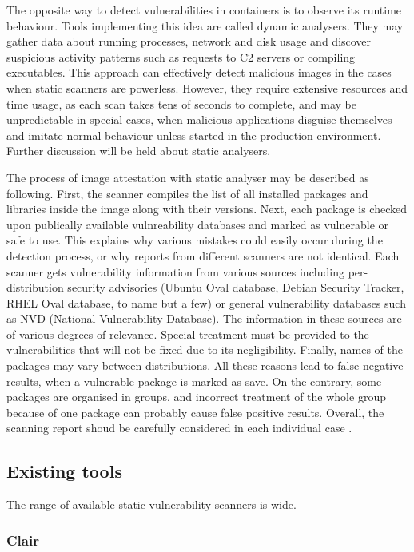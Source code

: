The opposite way to detect vulnerabilities in containers is to observe its runtime behaviour. Tools implementing this idea are called dynamic analysers. They may gather data about running processes, network and disk usage and discover suspicious activity patterns such as requests to C2 servers or compiling executables. This approach can effectively detect malicious images in the cases when static scanners are powerless. However, they require extensive resources and time usage, as each scan takes tens of seconds to complete, and may be unpredictable in special cases, when malicious applications disguise themselves and imitate normal behaviour unless started in the production environment. Further discussion will be held about static analysers.

The process of image attestation with static analyser may be described as following. First, the scanner compiles the list of all installed packages and libraries inside the image along with their versions. Next, each package is checked upon publically available vulnreability databases and marked as vulnerable or safe to use. This explains why various mistakes could easily occur during the detection process, or why reports from different scanners are not identical. Each scanner gets vulnerability information from various sources including per-distribution security advisories (Ubuntu Oval database, Debian Security Tracker, RHEL Oval database, to name but a few) or general vulnerability databases such as NVD (National Vulnerability Database). The information in these sources are of various degrees of relevance. Special treatment must be provided to the vulnerabilities that will not be fixed due to its negligibility. Finally, names of the packages may vary between distributions. All these reasons lead to false negative results, when a vulnerable package is marked as save. On the contrary, some packages are organised in groups, and incorrect treatment of the whole group because of one package can probably cause false positive results. Overall, the scanning report shoud be carefully considered in each individual case \cite{book:rice}.

\subsection{Existing tools}

The range of available static vulnerability scanners is wide. 

\subsubsection{Clair}


